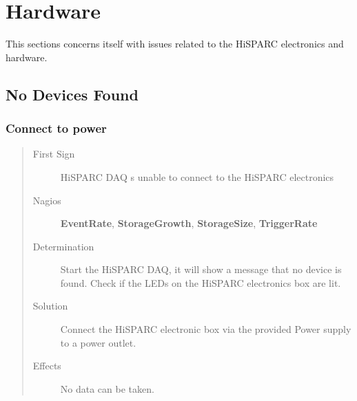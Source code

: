 \documentclass[a4paper,11pt,english]{sphinxmanual}
\begin{document}
\section{Hardware}
\label{known-issues:hardware}
This sections concerns itself with issues related to the HiSPARC
electronics and hardware.


\subsection{No Devices Found}
\label{known-issues:no-devices-found}

\subsubsection{Connect to power}
\label{known-issues:connect-to-power}\begin{quote}\begin{description}
\item[{First Sign}] \leavevmode
HiSPARC DAQ s unable to connect to the HiSPARC electronics

\item[{Nagios}] \leavevmode
\textbf{EventRate}, \textbf{StorageGrowth}, \textbf{StorageSize}, \textbf{TriggerRate}

\item[{Determination}] \leavevmode
Start the HiSPARC DAQ, it will show a message that no device is found. Check if the LEDs on the HiSPARC electronics box are lit.

\item[{Solution}] \leavevmode
Connect the HiSPARC electronic box via the provided Power supply to a power outlet.

\item[{Effects}] \leavevmode
No data can be taken.

\end{description}\end{quote}



\renewcommand{\indexname}{Index}
\printindex
\end{document}
